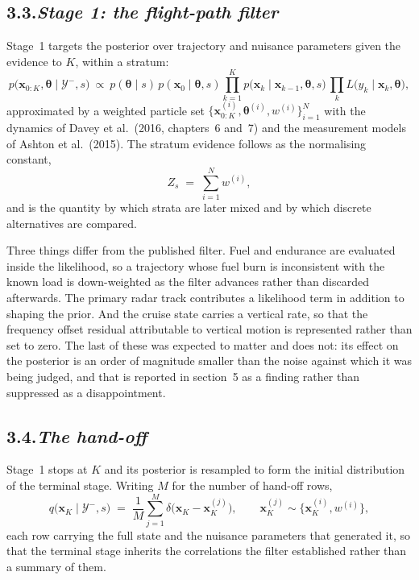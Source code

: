\documentclass[12pt,a4paper]{article}
\newcommand{\Ev}{\mathcal{Y}}
\newcommand{\state}{\mathbf{x}}
\newcommand{\nuis}{\boldsymbol{\theta}}
\begin{document}
\subsection*{3.3.\quad \textit{Stage 1: the flight-path filter}}

Stage~1 targets the posterior over trajectory and nuisance parameters given the evidence to
$K$, within a stratum:
%
\begin{equation}
p\bigl(\state_{0:K}, \nuis \mid \Ev^{-}, s\bigr)
 \ \propto\ p(\nuis \mid s)\, p(\state_0 \mid \nuis, s)
   \prod_{k=1}^{K} p\bigl(\state_k \mid \state_{k-1}, \nuis, s\bigr)\,
   \prod_{k} L\bigl(y_k \mid \state_k, \nuis\bigr),
\end{equation}
%
approximated by a weighted particle set $\{\state_{0:K}^{(i)}, \nuis^{(i)}, w^{(i)}\}_{i=1}^{N}$
with the dynamics of Davey et al.\ (2016, chapters~6 and~7) and the measurement models of
Ashton et al.\ (2015). The stratum evidence follows as the normalising constant,
%
\begin{equation}
Z_s \;=\; \sum_{i=1}^{N} w^{(i)},
\end{equation}
%
and is the quantity by which strata are later mixed and by which discrete alternatives are
compared.

Three things differ from the published filter. Fuel and endurance are evaluated inside the
likelihood, so a trajectory whose fuel burn is inconsistent with the known load is
down-weighted as the filter advances rather than discarded afterwards. The primary radar track
contributes a likelihood term in addition to shaping the prior. And the cruise state carries a
vertical rate, so that the frequency offset residual attributable to vertical motion is
represented rather than set to zero. The last of these was expected to matter and does not: its
effect on the posterior is an order of magnitude smaller than the noise against which it was
being judged, and that is reported in section~5 as a finding rather than suppressed as a
disappointment.

\subsection*{3.4.\quad \textit{The hand-off}}

Stage~1 stops at $K$ and its posterior is resampled to form the initial distribution of the
terminal stage. Writing $M$ for the number of hand-off rows,
%
\begin{equation}
q\bigl(\state_K \mid \Ev^{-}, s\bigr) \;=\; \frac{1}{M}\sum_{j=1}^{M}
  \delta\bigl(\state_K - \state_K^{(j)}\bigr),
  \qquad \state_K^{(j)} \sim \bigl\{\state_K^{(i)}, w^{(i)}\bigr\},
\end{equation}
%
each row carrying the full state and the nuisance parameters that generated it, so that the
terminal stage inherits the correlations the filter established rather than a summary of them.
\end{document}
